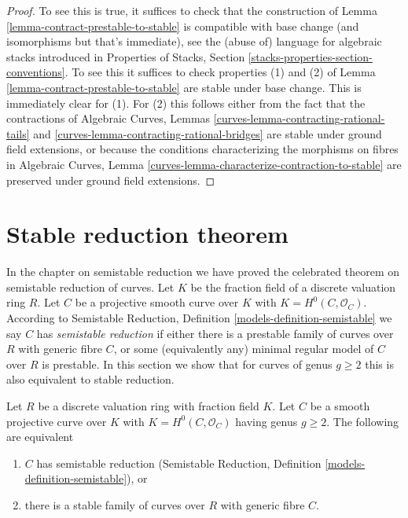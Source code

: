 \begin{proof}
To see this is true, it suffices to check that the construction of
Lemma \ref{lemma-contract-prestable-to-stable}
is compatible with base change (and isomorphisms but that's immediate),
see the (abuse of) language for algebraic stacks introduced
in Properties of Stacks, Section \ref{stacks-properties-section-conventions}.
To see this it suffices to check properties (1) and (2) of
Lemma \ref{lemma-contract-prestable-to-stable} are stable
under base change. This is immediately clear for (1).
For (2) this follows either from the fact that the contractions of
Algebraic Curves, Lemmas \ref{curves-lemma-contracting-rational-tails} and
\ref{curves-lemma-contracting-rational-bridges}
are stable under ground field extensions, or
because the conditions characterizing the morphisms on fibres in
Algebraic Curves, Lemma \ref{curves-lemma-characterize-contraction-to-stable}
are preserved under ground field extensions.
\end{proof}





\section{Stable reduction theorem}
\label{section-stable-reduction}

\noindent
In the chapter on semistable reduction we have proved the celebrated
theorem on semistable reduction of curves. Let $K$ be the fraction
field of a discrete valuation ring $R$. Let $C$ be a projective smooth
curve over $K$ with $K = H^0(C, \mathcal{O}_C)$. According to
Semistable Reduction, Definition \ref{models-definition-semistable}
we say $C$ has {\it semistable reduction} if either
there is a prestable family of curves over $R$ with generic fibre $C$, or
some (equivalently any) minimal regular model of $C$ over $R$ is prestable.
In this section we show that for curves of genus $g \geq 2$
this is also equivalent to stable reduction.

\begin{lemma}
\label{lemma-stable-reduction}
Let $R$ be a discrete valuation ring with fraction field $K$.
Let $C$ be a smooth projective curve over $K$ with
$K = H^0(C, \mathcal{O}_C)$ having genus $g \geq 2$.
The following are equivalent
\begin{enumerate}
\item $C$ has semistable reduction
(Semistable Reduction, Definition \ref{models-definition-semistable}), or
\item there is a stable family of curves over $R$ with generic fibre $C$.
\end{enumerate}
\end{lemma}


